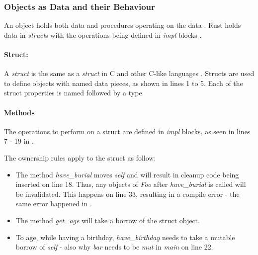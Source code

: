 \subsubsection{Objects as Data and their Behaviour}
An object holds both data and procedures operating on the data \cite{meyer_97_01,stefik_85_01,gamma_94_01,malik_09_01}.
Rust holds data in \textit{struct}s with the operations being defined in \textit{impl} blocks \cite{klabnik_2019_01}.

\paragraph{Struct:}
A \textit{struct} is the same as a \textit{struct} in C \cite{stroustrup_13_01} and other C-like languages \cite{robinson_04_01,savitch_15_01,malik_09_01}.
Structs are used to define objects with named data pieces, as shown in  lines 1 to 5.
Each of the struct properties is named followed by a type.

\paragraph{Methods}
The operations to perform on a struct are defined in \textit{impl} blocks, as seen in lines 7 - 19 in .

The ownership rules apply to the struct as follow:
\begin{itemize}
	\item The method \textit{have\_burial} moves \textit{self} and will result in cleanup code being inserted on line 18.
	      Thus, any objects of \textit{Foo} after \textit{have\_burial} is called will be invalidated.
	      This happens on line 33, resulting in a compile error - the same error happened in .
	\item The method \textit{get\_age} will take a borrow of the struct object.
	\item To age, while having a birthday, \textit{have\_birthday} needs to take a mutable borrow of \textit{self} - also why \textit{bar} needs to be \textit{mut} in \textit{main} on line 22.
\end{itemize}


\addtocounter{footnote}{1}
\addtocounter{footnote}{1}
\addtocounter{footnote}{1}

